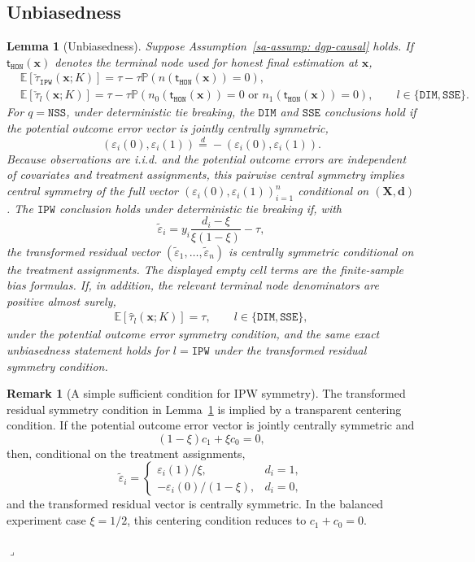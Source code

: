 \documentclass[10pt]{article}
\def\nodet{\mathsf{t}}
\def\bx{\mathbf{x}}
\def\E{\mathbb{E}}
\def\P{\mathbb{P}}
\def\DIM{\mathtt{DIM}}
\def\IPW{\mathtt{IPW}}
\def\SSE{\mathtt{SSE}}
\newtheorem{lemma}[theorem]{Lemma}
\theoremstyle{definition}
\newtheorem{remark_tmp}{Remark}
\newenvironment{remark}
	{ \begin{remark_tmp} 	}
	{ 
		\medskip\hfill{\LARGE$\lrcorner$}
		\end{remark_tmp} 
	}
\theoremstyle{remark}
\begin{document}
\subsection{Unbiasedness}\label{sa-sec: unbiased}

\begin{lemma}[Unbiasedness]\label{sa-lem: unbiased}
Suppose Assumption~\ref{sa-assump: dgp-causal} holds. If $\nodet_{\mathtt{HON}}(\bx)$ denotes the terminal node used for honest final estimation at $\bx$,
\begin{align*}
    & \E[\check\tau_{\IPW}(\bx;K)] = \tau - \tau \P(n(\nodet_{\mathtt{HON}}(\bx)) = 0), \\
    & \E[\check\tau_l(\bx;K)] = \tau - \tau \P(n_0(\nodet_{\mathtt{HON}}(\bx)) = 0 \text{ or } n_1(\nodet_{\mathtt{HON}}(\bx)) = 0), \qquad l \in \{\DIM, \SSE\}.
\end{align*}
For $q=\mathtt{NSS}$, under deterministic tie breaking, the $\mathtt{DIM}$ and $\mathtt{SSE}$ conclusions hold if the potential outcome error vector is jointly centrally symmetric,
\[
    (\varepsilon_i(0),\varepsilon_i(1)) \stackrel{d}{=} -(\varepsilon_i(0),\varepsilon_i(1)).
\]
Because observations are i.i.d. and the potential outcome errors are independent of covariates and treatment assignments, this pairwise central symmetry implies central symmetry of the full vector $(\varepsilon_i(0),\varepsilon_i(1))_{i=1}^n$ conditional on $(\mathbf X,\mathbf d)$.
The $\mathtt{IPW}$ conclusion holds under deterministic tie breaking if, with
\[
    \tilde\varepsilon_i
    =
    y_i\frac{d_i-\xi}{\xi(1-\xi)}-\tau,
\]
the transformed residual vector $(\tilde\varepsilon_1,\ldots,\tilde\varepsilon_n)$ is centrally symmetric conditional on the treatment assignments. The displayed empty cell terms are the finite-sample bias formulas. If, in addition, the relevant terminal node denominators are positive almost surely,
\begin{align*}
    \E[\hat\tau_l(\bx;K)] = \tau,
    \qquad l \in \{\mathtt{DIM},\mathtt{SSE}\},
\end{align*}
under the potential outcome error symmetry condition, and the same exact unbiasedness statement holds for $l=\mathtt{IPW}$ under the transformed residual symmetry condition.
\end{lemma}

\begin{remark}[A simple sufficient condition for IPW symmetry]\label{sa-rem:ipw-unbiased-symmetry}
The transformed residual symmetry condition in Lemma~\ref{sa-lem: unbiased} is implied by a transparent centering condition. If the potential outcome error vector is jointly centrally symmetric and
\[
    (1-\xi)c_1+\xi c_0=0,
\]
then, conditional on the treatment assignments,
\[
    \tilde\varepsilon_i
    =
    \begin{cases}
    \varepsilon_i(1)/\xi, & d_i=1,\\
    -\varepsilon_i(0)/(1-\xi), & d_i=0,
    \end{cases}
\]
and the transformed residual vector is centrally symmetric. In the balanced experiment case $\xi=1/2$, this centering condition reduces to $c_1+c_0=0$.
\end{remark}
\end{document}
